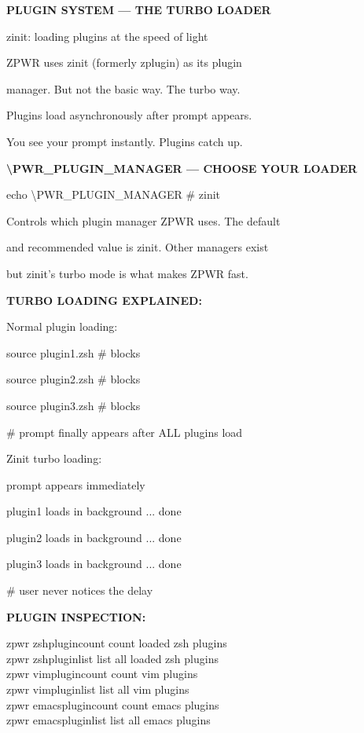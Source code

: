 \documentclass[11pt,a4paper,twoside]{book}
\begin{document}
\vspace{10pt}
{\large\bfseries\color{neoncyan} PLUGIN SYSTEM — THE TURBO LOADER}\vspace{6pt}

zinit: loading plugins at the speed of light

ZPWR uses zinit (formerly zplugin) as its plugin

manager. But not the basic way. The turbo way.

Plugins load asynchronously after prompt appears.

You see your prompt instantly. Plugins catch up.


\vspace{12pt}
{\bfseries\color{neonyellow} \textbackslash{}PWR\_PLUGIN\_MANAGER — CHOOSE YOUR LOADER}\vspace{4pt}

echo \textbackslash{}PWR\_PLUGIN\_MANAGER   \# zinit

Controls which plugin manager ZPWR uses. The default

and recommended value is zinit. Other managers exist

but zinit's turbo mode is what makes ZPWR fast.


\vspace{12pt}
{\bfseries\color{neonyellow} TURBO LOADING EXPLAINED:}\vspace{4pt}

Normal plugin loading:

source plugin1.zsh  \# blocks

source plugin2.zsh  \# blocks

source plugin3.zsh  \# blocks

\# prompt finally appears after ALL plugins load

Zinit turbo loading:

prompt appears immediately

plugin1 loads in background ... done

plugin2 loads in background ... done

plugin3 loads in background ... done

\# user never notices the delay


\vspace{12pt}
{\bfseries\color{neonyellow} PLUGIN INSPECTION:}\vspace{4pt}

\begin{codebox}
zpwr zshplugincount     count loaded zsh plugins\\
zpwr zshpluginlist      list all loaded zsh plugins\\
zpwr vimplugincount     count vim plugins\\
zpwr vimpluginlist      list all vim plugins\\
zpwr emacsplugincount   count emacs plugins\\
zpwr emacspluginlist    list all emacs plugins\\
\end{codebox}
\end{document}
